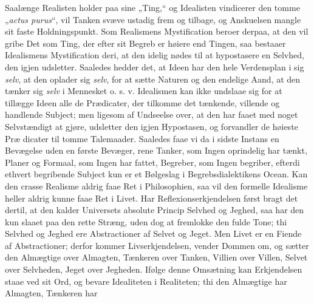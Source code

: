 \documentclass[12pt]{book}
\newcommand{\opage}[1]{\marginnote{\footnotesize\textit{[#1]}}}
\begin{document}
Saalænge Realisten holder paa sine „Ting,“ og Idealisten vindicerer den tomme
„\textit{actus purus}“, vil Tanken svæve ustadig frem og tilbage, og Anskuelsen mangle
sit faste Holdningspunkt. Som Realismens Mystification beroer derpaa, at den vil gribe
Det som Ting, der efter sit Begreb er høiere end Tingen, saa bestaaer Idealismens
Mystification deri, at den idelig nødes til at hypostasere en Selvhed, den igjen
udsletter. Saaledes hedder det, at Ideen har den hele Verdensplan i sig \emph{selv}, at
den oplader sig \emph{selv}, for at sætte Naturen og den endelige Aand, at den tænker sig
\emph{selv} i Mennesket o. s. v. Idealismen kan ikke undslaae sig for at tillægge Ideen
alle de Prædicater, der tilkomme det tænkende, villende og handlende Subject; men ligesom
af Undseelse over, at den har faaet med noget Selvstændigt at gjøre, udsletter den igjen
Hypostasen, og forvandler de høieste Præ%
\opage{185}dicater til tomme Talemaader. Saaledes faae vi da i sidste Instans en Bevægelse uden en
første Bevæger, rene Tanker, som Ingen oprindelig har tænkt, Planer og Formaal, som Ingen
har fattet, Begreber, som Ingen begriber, efterdi ethvert begribende Subject kun er et
Bølgeslag i Begrebsdialektikens Ocean. Kan den crasse Realisme aldrig faae Ret i
Philosophien, saa vil den formelle Idealisme heller aldrig kunne faae Ret i Livet. Har
Reflexionserkjendelsen først bragt det dertil, at den kalder Universets absolute Princip
Selvhed og Jeghed, saa har den kun slaaet paa den rette Stræng, uden dog at fremlokke den
fulde Tone; thi Selvhed og Jeghed ere Abstractioner af Selvet og Jeget. Men Livet er en
Fiende af Abstractioner; derfor kommer Livserkjendelsen, vender Dommen om, og sætter den
Almægtige over Almagten, Tænkeren over Tanken, Villien over Villen, Selvet over
Selvheden, Jeget over Jegheden. Ifølge denne Omsætning kan Erkjendelsen staae ved sit
Ord, og bevare Idealiteten i Realiteten; thi den Almægtige har Almagten, Tænkeren har
\end{document}
